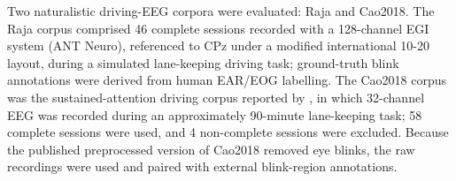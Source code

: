 
Two naturalistic driving-EEG corpora were evaluated: Raja and Cao2018. The Raja corpus comprised 46 complete sessions recorded with a 128-channel EGI system (ANT Neuro), referenced to CPz under a modified international 10-20 layout, during a simulated lane-keeping driving task; ground-truth blink annotations were derived from human EAR/EOG labelling. The Cao2018 corpus was the sustained-attention driving corpus reported by \citep{cao2019multichannel}, in which 32-channel EEG was recorded during an approximately 90-minute lane-keeping task; 58 complete sessions were used, and 4 non-complete sessions were excluded. Because the published preprocessed version of Cao2018 removed eye blinks, the raw recordings were used and paired with external blink-region annotations.
